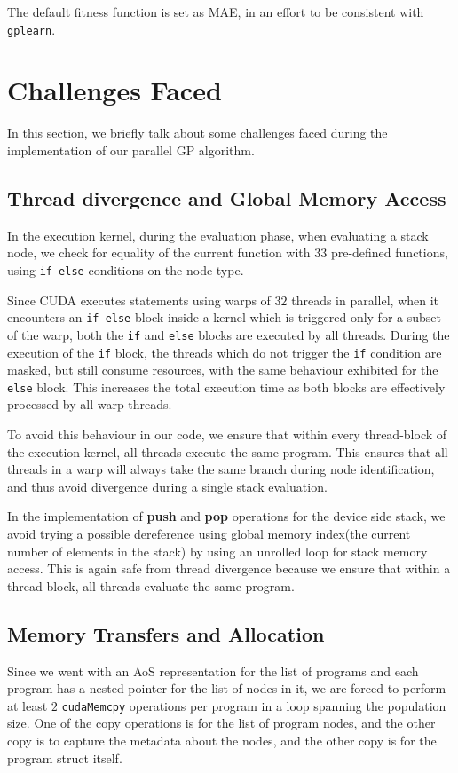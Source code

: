 The default fitness function is set as MAE, in an effort to be consistent with \texttt{gplearn}\citep{gplearn}.

\section{Challenges Faced}
\label{sec:challenges}
In this section, we briefly talk about some challenges faced during the implementation of our parallel GP algorithm.

\subsection{Thread divergence and Global Memory Access}
\label{prob:divergence}
In the execution kernel, during the evaluation phase, when evaluating a stack node, we check for equality of the current function with $33$ pre-defined functions, using \lstinline!if-else! conditions on the node type. 

Since CUDA executes statements using warps of $32$ threads in parallel, when it encounters an \lstinline!if-else! block inside a kernel which is triggered only for a subset of the warp, both the \lstinline!if! and \lstinline!else! blocks are executed by all threads. During the execution of the \lstinline!if! block, the threads which do not trigger the \lstinline!if! condition are masked, but still consume resources, with the same behaviour exhibited for the \lstinline!else! block. This increases the total execution time as both blocks are effectively processed by all warp threads. 

To avoid this behaviour in our code, we ensure that within every thread-block of the execution kernel, all threads execute the same program. This ensures that all threads in a warp will always take the same branch during node identification, and thus avoid divergence during a single stack evaluation.

In the implementation of \textbf{push} and \textbf{pop} operations for the device side stack, we avoid trying a possible dereference using global memory index(the current number of elements in the stack) by using an unrolled loop for stack memory access. This is again safe from thread divergence because we ensure that within a thread-block, all threads evaluate the same program. 

\subsection{Memory Transfers and Allocation}
\label{prob:memcpy}
Since we went with an AoS representation for the list of programs and each program has a nested pointer for the list of nodes in it, we are forced to perform at least $2$ \lstinline!cudaMemcpy! operations per program in a loop spanning the population size. One of the copy operations is for the list of program nodes, and the other copy is to capture the metadata about the nodes, and the other copy is for the program struct itself. 

